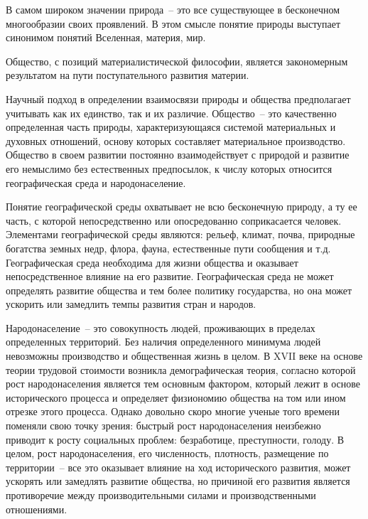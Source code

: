
В самом широком значении природа~-- это все существующее в бесконечном многообразии своих
проявлений. В этом смысле понятие природы выступает синонимом понятий Вселенная, материя, мир.

Общество, с позиций материалистической философии, является закономерным результатом на пути
поступательного развития материи.

Научный подход в определении взаимосвязи природы и общества предполагает учитывать как их
единство, так и их различие. Общество~-- это качественно определенная часть природы,
характеризующаяся системой материальных и духовных отношений, основу которых составляет
материальное производство. Общество в своем развитии постоянно взаимодействует с природой и
развитие его немыслимо без естественных предпосылок, к числу которых относится географическая
среда и народонаселение.

Понятие географической среды охватывает не всю бесконечную природу, а ту ее часть, с которой
непосредственно или опосредованно соприкасается человек. Элементами географической среды
являются: рельеф, климат, почва, природные богатства земных недр, флора, фауна, естественные
пути сообщения и т.д. Географическая среда необходима для жизни общества и оказывает
непосредственное влияние на его развитие. Географическая среда не может определять развитие
общества и тем более политику государства, но она может ускорить или замедлить темпы развития
стран и народов.

Народонаселение~-- это совокупность людей, проживающих в пределах определенных территорий. Без
наличия определенного минимума людей невозможны производство и общественная жизнь в целом. В
XVII веке на основе теории трудовой стоимости возникла демографическая теория, согласно
которой рост народонаселения является тем основным фактором, который лежит в основе
исторического процесса и определяет физиономию общества на том или ином отрезке этого процесса.
Однако довольно скоро многие ученые того времени поменяли свою точку зрения: быстрый рост
народонаселения неизбежно приводит к росту социальных проблем: безработице, преступности,
голоду. В целом, рост народонаселения, его численность, плотность, размещение по территории~--
все это оказывает влияние на ход исторического развития, может ускорять или замедлять развитие
общества, но причиной его развития является противоречие между производительными силами и
производственными отношениями. 

